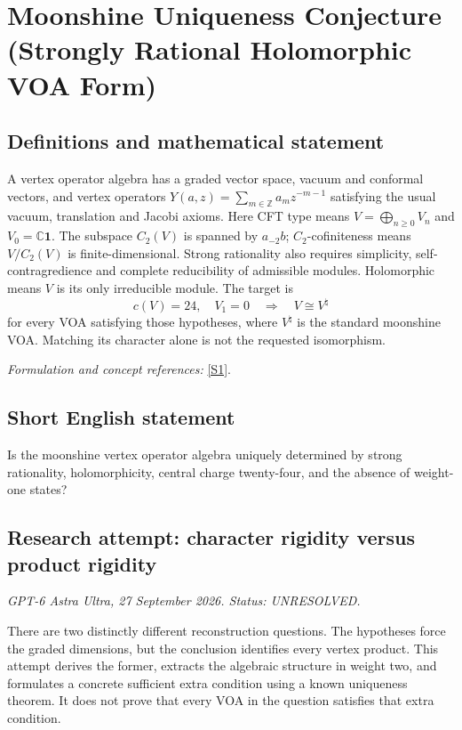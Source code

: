 \documentclass[11pt]{article}
\begin{document}
\section*{\texorpdfstring{Moonshine Uniqueness Conjecture (Strongly Rational Holomorphic VOA Form)}{Moonshine Uniqueness Conjecture (Strongly Rational Holomorphic VOA Form)}}\label{statement}
\subsection{Definitions and mathematical statement}
A vertex operator algebra has a graded vector space, vacuum and conformal vectors, and vertex operators $Y(a,z)=\sum_{m\in{\mathbb{Z}}}a_mz^{-m-1}$ satisfying the usual vacuum, translation and Jacobi axioms. Here CFT type means $V=\bigoplus_{n\ge0}V_n$ and $V_0={\mathbb{C}}\mathbf1$. The subspace $C_2(V)$ is spanned by $a_{-2}b$; $C_2$-cofiniteness means $V/C_2(V)$ is finite-dimensional. Strong rationality also requires simplicity, self-contragredience and complete reducibility of admissible modules. Holomorphic means $V$ is its only irreducible module. The target is
\[
 c(V)=24,\quad V_1=0\quad\Longrightarrow\quad V\cong V^{\natural}
\]
for every VOA satisfying those hypotheses, where $V^{\natural}$ is the standard moonshine VOA. Matching its character alone is not the requested isomorphism.
\par\smallskip\textit{Formulation and concept references:} \href{https://arxiv.org/pdf/2410.18166}{[S1]}.

\subsection{Short English statement}
Is the moonshine vertex operator algebra uniquely determined by strong rationality, holomorphicity, central charge twenty-four, and the absence of weight-one states?
\subsection{Research attempt: character rigidity versus product rigidity}
\textit{GPT-6 Astra Ultra, 27 September 2026. Status: UNRESOLVED.}

There are two distinctly different reconstruction questions. The hypotheses force the graded dimensions, but the conclusion identifies every vertex product. This attempt derives the former, extracts the algebraic structure in weight two, and formulates a concrete sufficient extra condition using a known uniqueness theorem. It does not prove that every VOA in the question satisfies that extra condition.
\end{document}
